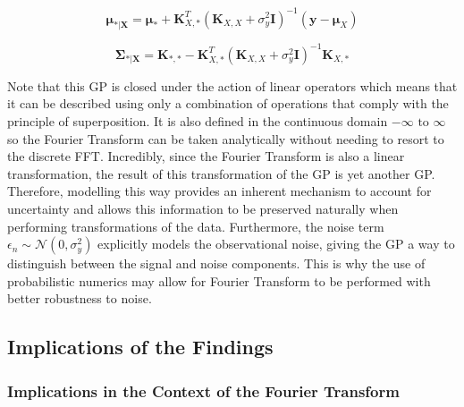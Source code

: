 \documentclass[12pt]{article}
\begin{document}
    \begin{equation}
        \boldsymbol{\mu}_{*\vert \mathbf{X}} = \boldsymbol{\mu}_* + \mathbf{K}_{X,*}^T (\mathbf{K}_{X,X} + \sigma^2_y \mathbf{I})^{-1} (\mathbf{y} - \boldsymbol{\mu}_X)\label{eq:18.52}
    \end{equation}

    \begin{equation}
        \boldsymbol{\Sigma}_{*\vert \mathbf{X}} = \mathbf{K}_{*,*} - \mathbf{K}_{X,*}^T (\mathbf{K}_{X,X} + \sigma^2_y \mathbf{I})^{-1} \mathbf{K}_{X,*}\label{eq:18.53}
    \end{equation}


    Note that this GP is closed under the action of linear operators which means that it can be described using only a combination of operations that comply with the principle of superposition.
    It is also defined in the continuous domain $-\infty \text{ to } \infty$ so the Fourier Transform can be taken analytically without needing to resort to the discrete FFT\@.
    Incredibly, since the Fourier Transform is also a linear transformation, the result of this transformation of the GP is yet another GP\@.
    Therefore, modelling this way provides an inherent mechanism to account for uncertainty and allows this information to be preserved naturally when performing transformations of the data.
    Furthermore, the noise term  $\epsilon_n \sim \mathcal{N}(0, \sigma^2_y)$ explicitly models the observational noise, giving the GP a way to distinguish between the signal and noise components.
    This is why the use of probabilistic numerics may allow for Fourier Transform to be performed with better robustness to noise.

    \subsection{Implications of the Findings}

    \subsubsection{Implications in the Context of the Fourier Transform}
\end{document}
